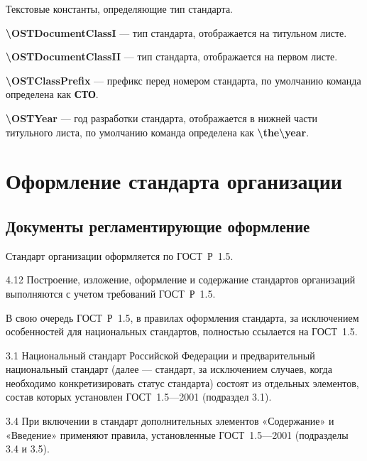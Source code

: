 \documentclass[12pt, twoside, final]{ruost}
\newcommand{\txtcmd}[1]{\textbf{\backslash{}#1}}
\begin{document}
\begin{OST}
				
				\point Текстовые константы, определяющие тип стандарта.
				
					\subpoint \txtcmd{OSTDocumentClassI} --- тип стандарта, отображается на титульном листе.
					
					\subpoint \txtcmd{OSTDocumentClassII} --- тип стандарта, отображается на первом листе.
					
					\subpoint \txtcmd{OSTClassPrefix} --- префикс перед номером стандарта,  по умолчанию команда определена как \textbf{СТО}.
					
				\point  \txtcmd{OSTYear} --- год разработки стандарта, отображается в нижней части титульного листа,  по умолчанию команда определена как \txtcmd{the\backslash{}year}.
		
		\section{Оформление стандарта организации}
		
			\subsection{Документы регламентирующие оформление}
			
				\point Стандарт организации оформляется по ГОСТ~Р~1.5.
				
					\begin{stdquote}
						\par 4.12 Построение, изложение, оформление и содержание стандартов организаций выполняются с учетом требований ГОСТ~Р~1.5.
						\par [ГОСТ Р 1.4---2004]
					\end{stdquote}
				
				\point В свою очередь ГОСТ~Р~1.5, в правилах оформления стандарта, за исключением особенностей для национальных стандартов, полностью ссылается на ГОСТ~1.5.
				
					\begin{stdquote}
						\par 3.1 Национальный стандарт Российской Федерации и предварительный национальный стандарт (далее — стандарт, за исключением случаев, когда необходимо конкретизировать статус стандарта) состоят из отдельных элементов, состав которых установлен ГОСТ~1.5—2001 (подраздел 3.1).
						\par [ГОСТ Р 1.5---2012]
					\end{stdquote}
					
					\begin{stdquote}
						\par 3.4 При включении в стандарт дополнительных элементов «Содержание» и «Введение» применяют правила, установленные ГОСТ~1.5—2001 (подразделы 3.4 и 3.5).
						\par [ГОСТ Р 1.5---2012]
					\end{stdquote}
					

\end{OST}
\end{document}
